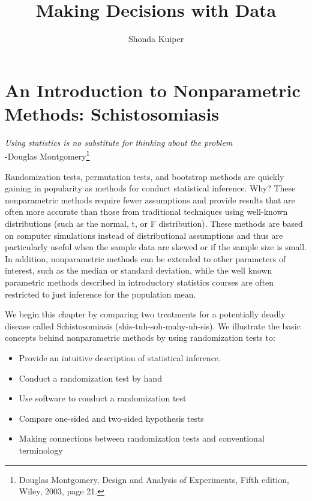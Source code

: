 \documentclass[
]{report}
\title{Making Decisions with Data}
\author{Shonda Kuiper}
\date{}
\providecommand{\tightlist}{%
  \setlength{\itemsep}{0pt}\setlength{\parskip}{0pt}}
\begin{document}
\maketitle

{
\setcounter{tocdepth}{1}
\tableofcontents
}
\hypertarget{an-introduction-to-nonparametric-methods-schistosomiasis}{%
\chapter{An Introduction to Nonparametric Methods: Schistosomiasis}\label{an-introduction-to-nonparametric-methods-schistosomiasis}}

{ \emph{Using statistics is no substitute for thinking about the problem}}\\
{ -Douglas Montgomery\footnote{Douglas Montgomery, Design and Analysis of Experiments, Fifth edition, Wiley, 2003, page 21.}
}

Randomization tests, permutation tests, and bootstrap methods are quickly gaining in popularity as methods for conduct statistical inference. Why? These nonparametric methods require fewer assumptions and provide results that are often more accurate than those from traditional techniques using well-known distributions (such as the normal, t, or F distribution). These methods are based on computer simulations instead of distributional assumptions and thus are particularly useful when the sample data are skewed or if the sample size is small. In addition, nonparametric methods can be extended to other parameters of interest, such as the median or standard deviation, while the well known parametric methods described in introductory statistics courses are often restricted to just inference for the population mean.

We begin this chapter by comparing two treatments for a potentially deadly disease called Schistosomiasis (shis-tuh-soh-mahy-uh-sis). We illustrate the basic concepts behind nonparametric methods by using randomization tests to:

\begin{itemize}
\tightlist
\item
  Provide an intuitive description of statistical inference.
\item
  Conduct a randomization test by hand
\item
  Use software to conduct a randomization test
\item
  Compare one-sided and two-sided hypothesis tests
\item
  Making connections between randomization tests and conventional terminology
\end{itemize}
\end{document}
